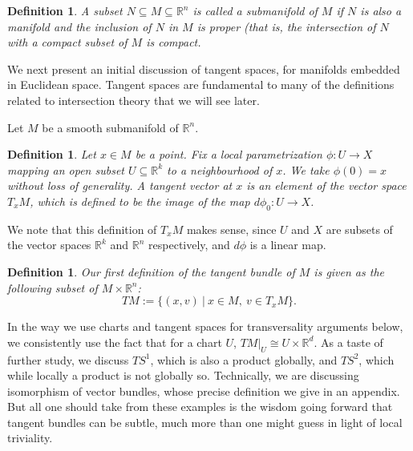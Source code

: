 \documentclass{amsart}          %
\newtheorem{definition}[theorem]{Definition}
\newcommand{\R}{\mathbb R}
\begin{document}
\begin{definition}
	A subset $N\subseteq M\subseteq \R^n$ is called a submanifold of $M$ if $N$ is also a manifold and the inclusion of $N$ in $M$ is
	proper (that is, the intersection of $N$ with a compact subset of $M$ is compact.
\end{definition}


We next present an initial discussion of tangent spaces, for manifolds embedded in Euclidean space. Tangent spaces are fundamental to many of the definitions related to intersection theory that we will see later.

Let $M$ be a smooth submanifold of $\R^n$. 
\begin{definition}
Let $x\in M$ be a point. Fix a local parametrization $\phi:U\to X$ mapping an open subset $U\subseteq\R^k$ to a neighbourhood of $x$. We take $\phi(0)=x$ without loss of generality. A \emph{tangent vector at $x$} is an element of the vector space $T_x M$, which is defined to be the image of the map $d\phi_0:U\to X$.
\end{definition}
We note that this definition of $T_xM$ makes sense, since $U$ and $X$ are subsets of the vector spaces $\R^k$ and $\R^n$ respectively, and $d\phi$ is a linear map.
\begin{definition}
Our first definition of \emph{the tangent bundle of $M$} is given as the following subset of $M\times\R^n$:
\[
TM:=
\{
(x,v)~|~x\in M,~v\in T_x M
\}.
\]
\end{definition}

In the way we use charts and tangent spaces for transversality arguments below, we consistently use the fact that for a chart
$U$,  $TM|_U \cong U \times \R^d$.  As a taste of further study, we discuss $TS^1$, which is also a product globally, and $TS^2$,
which while locally a product is not globally so.  Technically, we are discussing isomorphism of vector bundles, whose
precise definition we give in an appendix.  But all one should take from these examples is the wisdom going forward that tangent
bundles can be subtle, much more than one might guess in light of local triviality.
\end{document}
